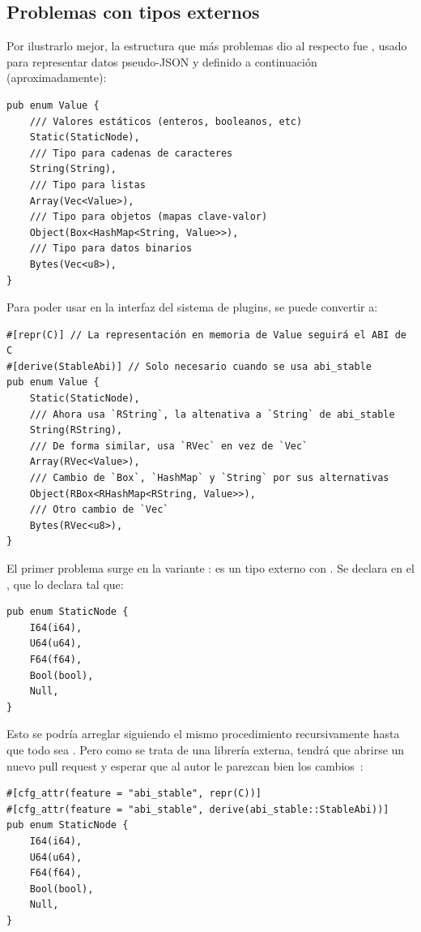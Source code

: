 \subsection{Problemas con tipos externos}

Por ilustrarlo mejor, la estructura que más problemas dio al respecto fue
, usado para representar datos pseudo-JSON y definido a continuación
(aproximadamente):

\begin{verbatim}
pub enum Value {
    /// Valores estáticos (enteros, booleanos, etc)
    Static(StaticNode),
    /// Tipo para cadenas de caracteres
    String(String),
    /// Tipo para listas
    Array(Vec<Value>),
    /// Tipo para objetos (mapas clave-valor)
    Object(Box<HashMap<String, Value>>),
    /// Tipo para datos binarios
    Bytes(Vec<u8>),
}
\end{verbatim}

Para poder usar  en la interfaz del sistema de plugins, se puede
convertir a:

\begin{verbatim}
#[repr(C)] // La representación en memoria de Value seguirá el ABI de C
#[derive(StableAbi)] // Solo necesario cuando se usa abi_stable
pub enum Value {
    Static(StaticNode),
    /// Ahora usa `RString`, la altenativa a `String` de abi_stable
    String(RString),
    /// De forma similar, usa `RVec` en vez de `Vec`
    Array(RVec<Value>),
    /// Cambio de `Box`, `HashMap` y `String` por sus alternativas
    Object(RBox<RHashMap<RString, Value>>),
    /// Otro cambio de `Vec`
    Bytes(RVec<u8>),
}
\end{verbatim}

El primer problema surge en la variante :  es un
tipo externo con . Se declara en el \crate
{}, que lo declara tal que:

\begin{verbatim}
pub enum StaticNode {
    I64(i64),
    U64(u64),
    F64(f64),
    Bool(bool),
    Null,
}
\end{verbatim}

Esto se podría arreglar siguiendo el mismo procedimiento recursivamente hasta
que todo sea \code{#[repr(C)]}. Pero como se trata de una librería externa,
tendrá que abrirse un nuevo pull request y esperar que al autor le parezcan bien
los cambios~\cite{openstaticnode}:

\begin{verbatim}
#[cfg_attr(feature = "abi_stable", repr(C))]
#[cfg_attr(feature = "abi_stable", derive(abi_stable::StableAbi))]
pub enum StaticNode {
    I64(i64),
    U64(u64),
    F64(f64),
    Bool(bool),
    Null,
}
\end{verbatim}

